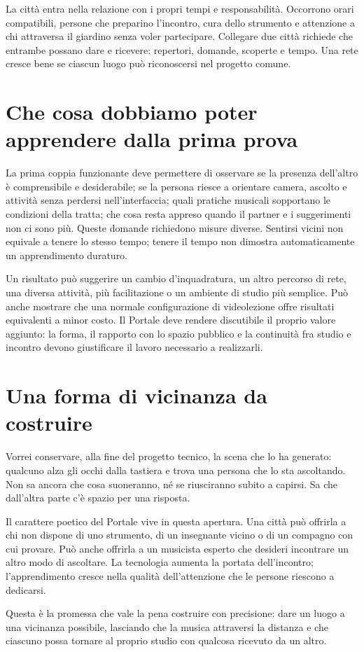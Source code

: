 La città entra nella relazione con i propri tempi e responsabilità. Occorrono orari compatibili, persone che preparino l'incontro, cura dello strumento e attenzione a chi attraversa il giardino senza voler partecipare. Collegare due città richiede che entrambe possano dare e ricevere: repertori, domande, scoperte e tempo. Una rete cresce bene se ciascun luogo può riconoscersi nel progetto comune.

\section{Che cosa dobbiamo poter apprendere dalla prima prova}
La prima coppia funzionante deve permettere di osservare se la presenza dell'altro è comprensibile e desiderabile; se la persona riesce a orientare camera, ascolto e attività senza perdersi nell'interfaccia; quali pratiche musicali sopportano le condizioni della tratta; che cosa resta appreso quando il partner e i suggerimenti non ci sono più. Queste domande richiedono misure diverse. Sentirsi vicini non equivale a tenere lo stesso tempo; tenere il tempo non dimostra automaticamente un apprendimento duraturo.

Un risultato può suggerire un cambio d'inquadratura, un altro percorso di rete, una diversa attività, più facilitazione o un ambiente di studio più semplice. Può anche mostrare che una normale configurazione di videolezione offre risultati equivalenti a minor costo. Il Portale deve rendere discutibile il proprio valore aggiunto: la forma, il rapporto con lo spazio pubblico e la continuità fra studio e incontro devono giustificare il lavoro necessario a realizzarli.

\section{Una forma di vicinanza da costruire}
Vorrei conservare, alla fine del progetto tecnico, la scena che lo ha generato: qualcuno alza gli occhi dalla tastiera e trova una persona che lo sta ascoltando. Non sa ancora che cosa suoneranno, né se riusciranno subito a capirsi. Sa che dall'altra parte c'è spazio per una risposta.

Il carattere poetico del Portale vive in questa apertura. Una città può offrirla a chi non dispone di uno strumento, di un insegnante vicino o di un compagno con cui provare. Può anche offrirla a un musicista esperto che desideri incontrare un altro modo di ascoltare. La tecnologia aumenta la portata dell'incontro; l'apprendimento cresce nella qualità dell'attenzione che le persone riescono a dedicarsi.

Questa è la promessa che vale la pena costruire con precisione: dare un luogo a una vicinanza possibile, lasciando che la musica attraversi la distanza e che ciascuno possa tornare al proprio studio con qualcosa ricevuto da un altro.

